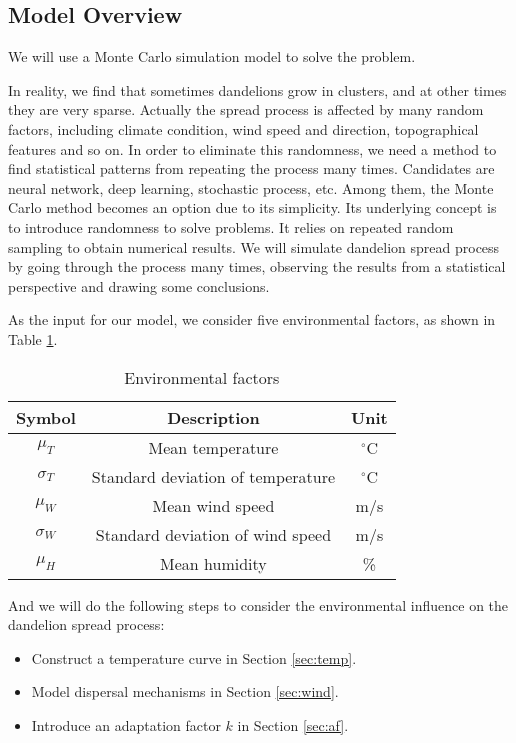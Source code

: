 \documentclass[12pt]{article}
\begin{document}
	
	

	
	\subsection{Model Overview}
		
		We will use a Monte Carlo simulation model to solve the problem.
		
		In reality, we find that sometimes dandelions grow in clusters, and at other times they are very sparse. Actually the spread process is affected by many random factors, including climate condition, wind speed and direction, topographical features and so on.  In order to eliminate this randomness, we need a method to find statistical patterns from repeating the process many times.  Candidates are neural network, deep learning, stochastic process, etc.  Among them, the Monte Carlo method becomes an option due to its simplicity.  Its underlying concept is to introduce randomness to solve problems.   It relies on repeated random sampling to obtain numerical results.  We will simulate dandelion spread process by going through the process many times, observing the results from a statistical perspective and drawing some conclusions.
		
		As the input for our model, we consider five environmental factors, as shown in Table \ref{tb:vars}.  
		
		{
			\fontsize{10}{14}\selectfont
			{
				\begin{longtable}{ccc}
					\caption{Environmental factors}
					\label{tb:vars}\\
					\toprule
					Symbol&Description&Unit\\
					\toprule
					$\mu_T$&Mean temperature&$^\circ$C\\
					$\sigma_T$&Standard deviation of temperature&$^\circ$C\\
					$\mu_W$&Mean wind speed&m/s\\
					$\sigma_W$&Standard deviation of wind speed&m/s\\
					$\mu_H$&Mean humidity&\%\\
					\bottomrule
				\end{longtable}
			}
		}
		
		And we will do the following steps to consider the environmental influence on the dandelion spread process:
		
		\begin{itemize}
			\vspace{-0.5cm}
			\item Construct a temperature curve in Section \ref{sec:temp}.  
			
			\vspace{-0.2cm}
			\item Model dispersal mechanisms in Section \ref{sec:wind}.
			
			\vspace{-0.2cm}
			\item Introduce an adaptation factor $k$ in Section \ref{sec:af}.  
		
		\end{itemize}
	
\end{document}
